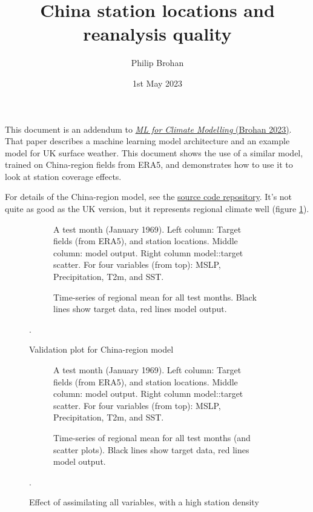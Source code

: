 \documentclass[a4paper,12pt]{article}
\title{China station locations and reanalysis quality}
\author{Philip Brohan}
\date{1st May 2023}
\begin{document}
 
\maketitle

This document is an addendum to \href{https://metoffice.sharepoint.com/:b:/r/sites/csspchinaext/MO%20Outputs%20Upload/WP1/Papers/D1.6.3_Brohan_ML_for_climate_modelling.pdf?csf=1&web=1&e=G4ypno}{{\it ML for Climate Modelling} (Brohan 2023)}. That paper describes a machine learning model architecture and an example model for UK surface weather. This document shows the use of a similar model, trained on China-region fields from ERA5, and demonstrates how to use it to look at station coverage effects.

For details of the China-region model, see the \href{https://github.com/philip-brohan/ML_monthly_China}{source code repository}. It's not quite as good as the UK version, but it represents regional climate well (figure \ref{Validation}).



\begin{figure}[h]
\begin{subfigure}{1.0\textwidth}    
\caption{A test month (January 1969). Left column: Target fields (from ERA5), and station locations. Middle column: model output. Right column model::target scatter. For four variables (from top): MSLP, Precipitation, T2m, and SST.}
\end{subfigure}
\begin{subfigure}{1.0\textwidth}    
\caption{Time-series of regional mean for all test months. Black lines show target data, red lines model output.}
\end{subfigure}
\caption{Validation plot for China-region model}.
\label{Validation}
\end{figure}
     
\pagebreak
\begin{figure}[h]
\begin{subfigure}{1.0\textwidth}    
\caption{A test month (January 1969). Left column: Target fields (from ERA5), and station locations. Middle column: model output. Right column model::target scatter. For four variables (from top): MSLP, Precipitation, T2m, and SST.}
\end{subfigure}
\begin{subfigure}{1.0\textwidth}    
\caption{Time-series of regional mean for all test months (and scatter plots). Black lines show target data, red lines model output.}
\end{subfigure}
\caption{Effect of assimilating all variables, with a high station density}.
\label{All_05}
\end{figure}
    
\end{document}
